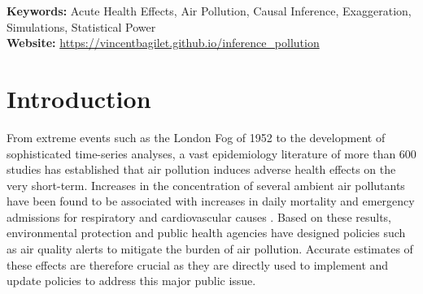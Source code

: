 \documentclass[12pt]{article}
\renewcommand{\thefootnote}{\fnsymbol{footnote}}
\begin{document}
\begin{titlepage}
\begin{abstract}
\end{abstract}
\vspace{0.3cm}
{\selectfont \textbf{Keywords:}} Acute Health Effects, Air Pollution, Causal Inference, Exaggeration, Simulations, Statistical Power\\[3pt] 
{\selectfont \textbf{Website:}} \url{https://vincentbagilet.github.io/inference_pollution}\\[3pt] 
\setcounter{page}{0}
\thispagestyle{empty}
\end{titlepage}
\renewcommand{\thefootnote}{\arabic{footnote}}
\setcounter{footnote}{0}
\pagebreak \newpage

\onehalfspacing




\section{Introduction}

     
    From extreme events such as the London Fog of 1952 to the development of sophisticated time-series analyses, a vast epidemiology literature of more than 600 studies has established that air pollution induces adverse health effects on the very short-term. Increases in the concentration of several ambient air pollutants have been found to be associated with increases in daily mortality and emergency admissions for respiratory and cardiovascular causes \citep{schwartz1994people, samet2000national, le2002short, bell2004time, liu_ambient_2019}. 
    Based on these results, environmental protection and public health agencies have designed policies such as air quality alerts to mitigate the burden of air pollution. Accurate estimates of these effects are therefore crucial as they are directly used to implement and update policies to address this major public issue.
    
\end{document}
